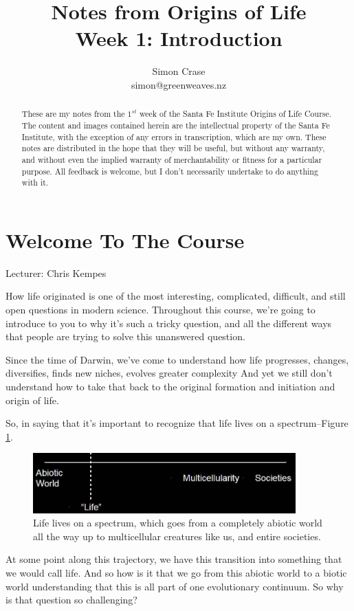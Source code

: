 \documentclass[]{article}
\title{
	Notes from Origins of Life\\
	Week 1: Introduction
}
\author{Simon Crase\\simon@greenweaves.nz}
\begin{document}
\maketitle

\begin{abstract}
    These are my notes from the $1^{st}$ week of the Santa Fe Institute Origins of Life Course\cite{sfi2020}.\\
    The content and images contained herein are the intellectual property of the Santa Fe Institute, with the exception of any errors in transcription, which are my own.
    These notes are distributed in the hope that they will be useful,
    but without any warranty, and without even the implied warranty of
     merchantability or fitness for a particular purpose. All feedback is welcome,
    but I don't necessarily undertake to do anything with it.
\end{abstract}

\setcounter{tocdepth}{2}
\tableofcontents
\listoffigures

\section{Welcome To The Course}

Lecturer: Chris Kempes

How life originated is one of the most interesting, complicated, difficult, and still open questions in modern science. Throughout this course, we're going to
introduce to you to why it's such a tricky question, and all the different ways that people are trying to solve this unanswered question.	

Since the time of Darwin, we've come to understand how life
progresses, changes, diversifies, finds new niches, evolves greater complexity
And yet we still don't understand how to take that back to
the original formation and initiation and origin of life.


So, in saying that it's important to recognize that life lives on a spectrum--Figure \ref{fig:lifesTransitions}.

\begin{figure}[H]
	\caption[Life lives on a spectrum]{Life lives on a spectrum, which goes from a completely abiotic world
		all the way up to multicellular creatures like us, and entire societies.}\label{fig:lifesTransitions}
	\includegraphics[width=0.9\textwidth]{lifesTransitions}
\end{figure}
At some point along this trajectory, we have this transition into something
that we would call life. And so how is it that we go from this
abiotic world to a biotic world understanding that this is all part of one
evolutionary continuum. So why is that question so challenging?
\end{document}

